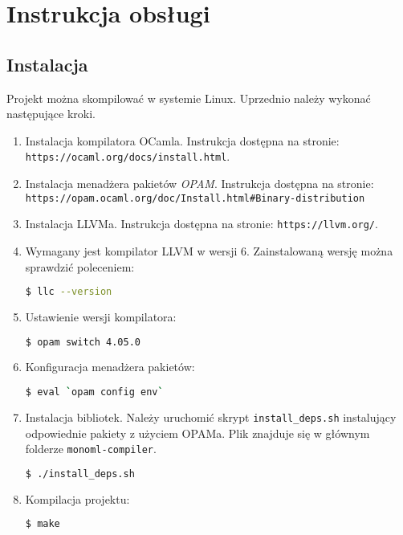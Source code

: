 \documentclass[declaration,shortabstract]{iithesis}
\begin{document}

\chapter{Instrukcja obsługi}

\section{Instalacja}

Projekt można skompilować w systemie Linux.
Uprzednio należy wykonać następujące kroki. 

\begin{enumerate}
  \item Instalacja kompilatora OCamla. Instrukcja dostępna na stronie: \newline
  \texttt{https://ocaml.org/docs/install.html}.
  \item Instalacja menadżera pakietów \textit{OPAM}. 
  Instrukcja dostępna na stronie: \newline
  \texttt{https://opam.ocaml.org/doc/Install.html\#Binary-distribution}
  \item Instalacja LLVMa. Instrukcja dostępna na stronie: \newline
  \texttt{https://llvm.org/}.
  \item Wymagany jest kompilator LLVM w wersji $6$. Zainstalowaną 
  wersję można sprawdzić poleceniem:
  \begin{lstlisting}[language=bash]
  $ llc --version
  \end{lstlisting}
  \item Ustawienie wersji kompilatora:
  \begin{lstlisting}[language=bash]
  $ opam switch 4.05.0
  \end{lstlisting}
  \item Konfiguracja menadżera pakietów:
  \begin{lstlisting}[language=bash]
  $ eval `opam config env`
  \end{lstlisting}
  \item Instalacja bibliotek. Należy uruchomić skrypt \texttt{install\_deps.sh}
   instalujący odpowiednie pakiety z użyciem OPAMa. Plik znajduje się 
   w głównym folderze 
  \texttt{monoml-compiler}. 
  \begin{lstlisting}[language=bash]
  $ ./install_deps.sh
  \end{lstlisting}
  \item Kompilacja projektu:
  \begin{lstlisting}[language=bash]
  $ make 
  \end{lstlisting}
\end{enumerate}
\end{document}
